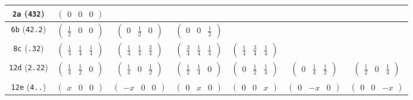 \documentclass[fleqn,9pt,landscape]{jsarticle}
\begin{document}
\begin{center}
\begin{longtable}{ccccccc}
{\tt 2a} ({\tt 432}) & $ \begin{pmatrix} 0 & 0 & 0 \end{pmatrix} $ & $  $ & $  $ & $  $ & $  $ & $  $ \\ \hline
{\tt 6b} ({\tt 42.2}) & $ \begin{pmatrix} \frac{1}{2} & 0 & 0 \end{pmatrix} $ & $ \begin{pmatrix} 0 & \frac{1}{2} & 0 \end{pmatrix} $ & $ \begin{pmatrix} 0 & 0 & \frac{1}{2} \end{pmatrix} $ & $  $ & $  $ & $  $ \\ \hline
{\tt 8c} ({\tt .32}) & $ \begin{pmatrix} \frac{1}{4} & \frac{1}{4} & \frac{1}{4} \end{pmatrix} $ & $ \begin{pmatrix} \frac{1}{4} & \frac{1}{4} & \frac{3}{4} \end{pmatrix} $ & $ \begin{pmatrix} \frac{3}{4} & \frac{1}{4} & \frac{1}{4} \end{pmatrix} $ & $ \begin{pmatrix} \frac{1}{4} & \frac{3}{4} & \frac{1}{4} \end{pmatrix} $ & $  $ & $  $ \\ \hline
{\tt 12d} ({\tt 2.22}) & $ \begin{pmatrix} \frac{1}{4} & \frac{1}{2} & 0 \end{pmatrix} $ & $ \begin{pmatrix} \frac{1}{4} & 0 & \frac{1}{2} \end{pmatrix} $ & $ \begin{pmatrix} \frac{1}{2} & \frac{1}{4} & 0 \end{pmatrix} $ & $ \begin{pmatrix} 0 & \frac{1}{2} & \frac{1}{4} \end{pmatrix} $ & $ \begin{pmatrix} 0 & \frac{1}{4} & \frac{1}{2} \end{pmatrix} $ & $ \begin{pmatrix} \frac{1}{2} & 0 & \frac{1}{4} \end{pmatrix} $ \\ \hline
{\tt 12e} ({\tt 4..}) & $ \begin{pmatrix} x & 0 & 0 \end{pmatrix} $ & $ \begin{pmatrix} - x & 0 & 0 \end{pmatrix} $ & $ \begin{pmatrix} 0 & x & 0 \end{pmatrix} $ & $ \begin{pmatrix} 0 & 0 & x \end{pmatrix} $ & $ \begin{pmatrix} 0 & - x & 0 \end{pmatrix} $ & $ \begin{pmatrix} 0 & 0 & - x \end{pmatrix} $ \\ \hline

\end{longtable}
\end{center}
\end{document}
